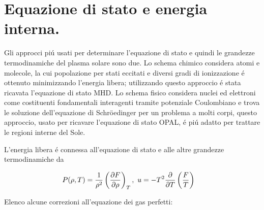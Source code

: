 \documentclass[../main.tex]{subfiles}
\begin{document}
\section{Equazione di stato e energia interna.}

Gli approcci pi\'u usati per determinare l'equazione di stato e quindi le grandezze termodinamiche del plasma solare sono due. Lo schema chimico considera atomi e molecole, la cui popolazione per stati eccitati e diversi gradi di ionizzazione \'e ottenuto minimizzando l'energia libera; utilizzando questo approccio \'e stata ricavata l'equazione di stato MHD. Lo schema fisico considera nuclei ed elettroni come costituenti fondamentali interagenti tramite potenziale Coulombiano e trova le soluzione dell'equazione di Schr\"oedinger per un problema a molti corpi, questo approccio, usato per ricavare l'equazione di stato OPAL, \'e pi\'u adatto per trattare le regioni interne del Sole.

L'energia libera \'e connessa all'equazione di stato e alle altre grandezze termodinamiche da

\begin{align}
&P(\rho,T)=\frac{1}{\rho^2}\Dcvar{\PDy{\rho}{F}}{T},\ u=-T^2\PDof{T}\left(\frac{F}{T}\right)
\end{align}
 
Elenco alcune correzioni all'equazione dei gas perfetti:
\end{document}
